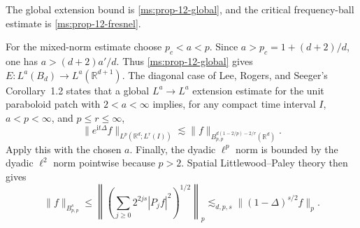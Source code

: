 The global extension bound is \ref{ms:prop-12-global}, and the critical frequency-ball estimate is \ref{ms:prop-12-fresnel}.

For the mixed-norm estimate choose $p_c<a<p$. Since $a>p_c=1+(d+2)/d$, one has $a>(d+2)a'/d$. Thus \ref{ms:prop-12-global} gives $E:L^a(B_d)\to L^a(\mathbb R^{d+1})$. The diagonal case of Lee, Rogers, and Seeger's Corollary~1.2 \cite{r-51} states that a global $L^a\to L^a$ extension estimate for the unit paraboloid patch with $2<a<\infty$ implies, for any compact time interval $I$, $a<p<\infty$, and $p\leq r\leq\infty$,
\[
\|e^{\mathrm it\Delta}f\|_{L^p(\mathbb R^d;L^r(I))}
 \lesssim \|f\|_{B^{d(1-2/p)-2/r}_{p,p}(\mathbb R^d)}.
\]
Apply this with the chosen $a$. Finally, the dyadic $\ell^p$ norm is bounded by the dyadic $\ell^2$ norm pointwise because $p>2$. Spatial Littlewood--Paley theory then gives
\[
\|f\|_{B^s_{p,p}}\leq
 \left\|\left(\sum_{j\geq0}2^{2js}|P_j f|^2\right)^{1/2}\right\|_p
 \lesssim_{d,p,s}\|(1-\Delta)^{s/2}f\|_p.
\]
